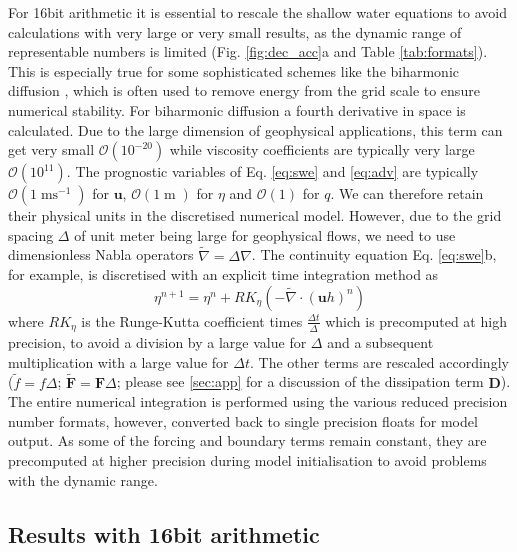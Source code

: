 \documentclass[draft]{agujournal2019}
\newcommand{\op}{\operatorname}
\begin{document}
For 16bit arithmetic it is essential to rescale the shallow water equations to avoid calculations with very large or very small results, as the dynamic range of representable numbers is limited (Fig. \ref{fig:dec_acc}a and Table \ref{tab:formats}). This is especially true for some sophisticated schemes like the biharmonic diffusion \cite{Griffies2000}, which is often used to remove energy from the grid scale to ensure numerical stability. For biharmonic diffusion a fourth derivative in space is calculated. Due to the large dimension of geophysical applications, this term can get very small $\mathcal{O}(10^{-20})$ while viscosity coefficients are typically very large $\mathcal{O}(10^{11})$. The prognostic variables of Eq. \ref{eq:swe} and \ref{eq:adv} are typically $\mathcal{O}(1\op{ms}^{-1})$ for $\mathbf{u}$, $\mathcal{O}(1\op{m})$ for $\eta$ and $\mathcal{O}(1)$ for $q$. We can therefore retain their physical units in the discretised numerical model. However, due to the grid spacing $\Delta$ of unit meter being large for geophysical flows, we need to use dimensionless Nabla operators $\tilde{\nabla} = \Delta\nabla$. The continuity equation Eq. \ref{eq:swe}b, for example, is discretised with an explicit time integration method as
\begin{equation}
\eta^{n+1} = \eta^n + RK_{\eta}\left( - \tilde{\nabla} \cdot (\mathbf{u}h)^n\right)
\end{equation}
where $RK_\eta$ is the Runge-Kutta coefficient times $\tfrac{\Delta t}{\Delta}$ which is precomputed at high precision, to avoid a division by a large value for $\Delta$ and a subsequent multiplication with a large value for $\Delta t$. The other terms are rescaled accordingly ($\tilde{f} = f\Delta$; $\tilde{\mathbf{F}} = \mathbf{F}\Delta$; please see \ref{sec:app} for a discussion of the dissipation term $\mathbf{D}$). The entire numerical integration is performed using the various reduced precision number formats, however, converted back to single precision floats for model output. As some of the forcing and boundary terms remain constant, they are precomputed at higher precision during model initialisation to avoid problems with the dynamic range.


\subsection{Results with 16bit arithmetic}
\end{document}
